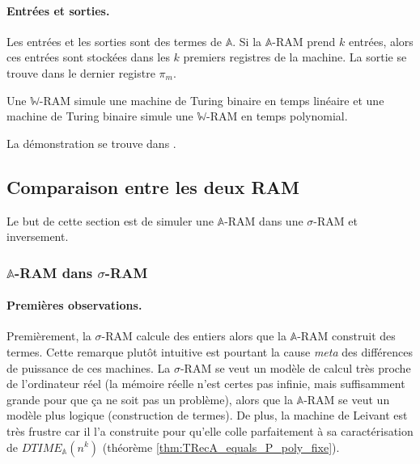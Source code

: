 \documentclass{report}
\newcommand{\bbA}{\mathbb{A}}
\begin{document}
		
			\paragraph{Entrées et sorties.}
			Les entrées et les sorties sont des termes de $\bbA$. Si la $\bbA$-RAM prend $k$ entrées, alors ces entrées sont stockées dans les $k$ premiers registres de la machine. La sortie se trouve dans le dernier registre $\pi_m$. 
		
		
		\begin{theorem}
			\label{thm:ARAMs_turing_complete}
			Une $\mathbb{W}$-RAM simule une machine de Turing binaire en temps linéaire et une machine de Turing binaire simule une $\mathbb{W}$-RAM en temps polynomial.
		\end{theorem}
			
		La démonstration se trouve dans \cite{Leivant1995}.
		
		
		
		
		\subsection{Comparaison entre les deux RAM}
		\label{subsec:comparaison_RAMs}

			Le but de cette section est de simuler une $\bbA$-RAM dans une $\sigma$-RAM et inversement.
			
			\subsubsection{$\bbA$-RAM dans $\sigma$-RAM}
			\label{subsubsec:sim_A_RAM_sigma_RAM}
	
				
				\paragraph{Premières observations.}
				\label{par:premieres_observations}
				Premièrement, la $\sigma$-RAM calcule des entiers alors que la $\bbA$-RAM construit des termes. Cette remarque plutôt intuitive est pourtant la cause \emph{meta} des différences de puissance de ces machines. La $\sigma$-RAM se veut un modèle de calcul très proche de l'ordinateur réel (la mémoire réelle n'est certes pas infinie, mais suffisamment grande pour que ça ne soit pas un problème), alors que la $\bbA$-RAM se veut un modèle plus logique (construction de termes). De plus, la machine de Leivant est très frustre car il l'a construite pour qu'elle colle parfaitement à sa caractérisation de $DTIME_{\bbA}(n^k)$ (théorème \ref{thm:TRecA_equals_P_poly_fixe}).
				
\end{document}
